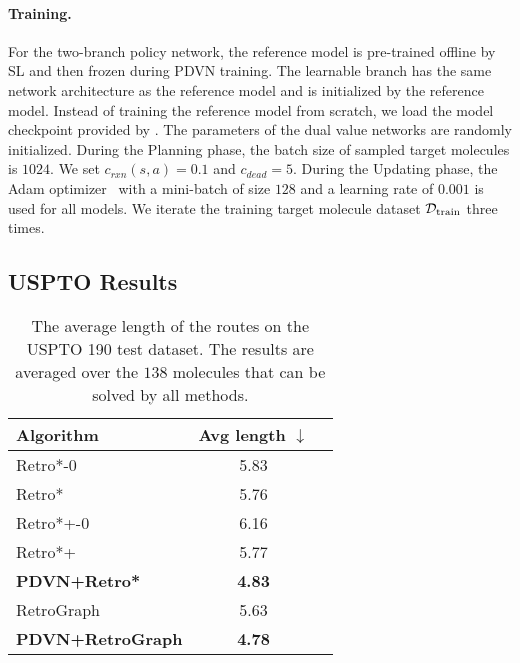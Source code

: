 \documentclass[nohyperref]{article}
\theoremstyle{plain}
\theoremstyle{definition}
\theoremstyle{remark}
\begin{document}
\paragraph{Training.}
For the two-branch policy network, the reference model is pre-trained offline by SL and then frozen during PDVN training. 
The learnable branch has the same network architecture as the reference model and is initialized by the reference model. 
Instead of training the reference model from scratch, we load the model checkpoint provided by \cite{chen20retrostar}.
The parameters of the dual value networks are randomly initialized.
During the Planning phase, the batch size of sampled target molecules is $1024$.
We set $c_{rxn}(s, a) = 0.1$ and $c_{dead} = 5$. 
During the Updating phase, the Adam optimizer~\cite{kingma2014adam} with a mini-batch of size $128$ and a learning rate of $0.001$ is used  for all models.
We iterate the training target molecule dataset $\mathcal{D}_{\rm train}$ three times.




















\subsection{USPTO Results}

\begin{table}[t]
    \caption{The average length of the routes on the USPTO 190 test dataset. The results are averaged over the $138$ molecules that can be solved by all methods.}
    \label{tab:quality_metrics}
    \centering
    \begin{tabular}{l c c}
        \toprule
Algorithm & Avg length $\downarrow$ \\
\midrule
        Retro*-0 & 5.83 \\ 
Retro* & 5.76 \\
Retro*+-0 & 6.16 \\
Retro*+ & 5.77 \\
\textbf{PDVN+Retro*} & \textbf{4.83} \\
\midrule
        RetroGraph & 5.63 \\
\textbf{PDVN+RetroGraph} & \textbf{4.78}\\ 
\bottomrule
    \end{tabular}
\end{table}
\end{document}
